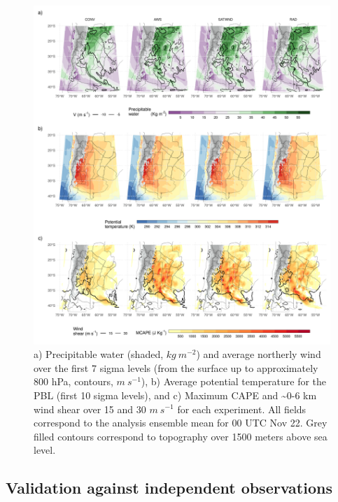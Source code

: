 \documentclass[preprint, 3p, authoryear,review, 12pt]{elsarticle} %
\begin{document}
\begin{figure}
\includegraphics[width=1\linewidth]{../figures/summary-fields-1} \caption{a) Precipitable water (shaded, \(kg\ m^{-2}\)) and average northerly wind over the first 7 sigma levels (from the surface up to approximately 800 hPa, contours, \(m\ s^{-1}\)), b) Average potential temperature for the PBL (first 10 sigma levels), and c) Maximum CAPE and \textasciitilde0-6 km wind shear over 15 and 30 \(m\ s^{-1}\) for each experiment. All fields correspond to the analysis ensemble mean for 00 UTC Nov 22. Grey filled contours correspond to topography over 1500 meters above sea level.}\label{fig:summary-fields}
\end{figure}

\hypertarget{validation-against-independent-observations}{%
\subsection{Validation against independent observations}\label{validation-against-independent-observations}}
\end{document}
